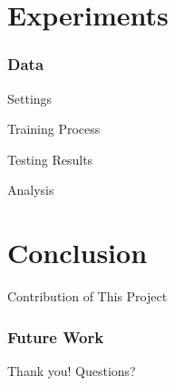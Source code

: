 \documentclass{beamer}
\begin{document}
\section{Experiments}

\begin{frame} \frametitle{Data}

\end{frame}

\begin{frame}{Settings}

\end{frame}

\begin{frame}{Training Process}

\end{frame}

\begin{frame}{Testing Results}

\end{frame}

\begin{frame}{Analysis}

\end{frame}

\section{Conclusion}

\begin{frame}{Contribution of This Project}

\end{frame}

\begin{frame} \frametitle{Future Work}

\end{frame}

\begin{frame}
Thank you! Questions?
\end{frame}
\end{document}
